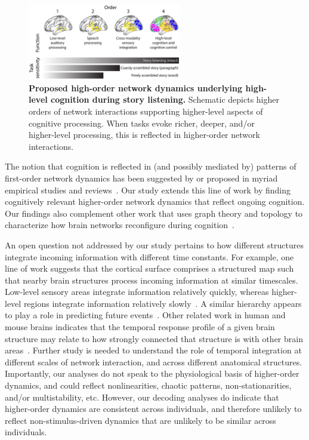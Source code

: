\documentclass[english]{article}
\begin{document}
\begin{figure}[tp]
  \centering
  \includegraphics[width=0.6\textwidth]{figs/discussion}
  \caption{\textbf{Proposed high-order network dynamics underlying
       high-level cognition during story listening.}  Schematic depicts
    higher orders of
    network interactions supporting higher-level aspects of cognitive
    processing.  When tasks evoke richer, deeper, and/or higher-level
    processing, this is reflected in higher-order network
    interactions.}
  \label{fig:discussion}
\end{figure}

The notion that cognition is reflected in (and possibly mediated by)
patterns of first-order network dynamics has been suggested by or
proposed in myriad empirical studies and
reviews~\cite{DemeEtal19, Turk13, LuriEtal18, FongEtal19,
  ParkEtal18b, PretEtal17, MannEtal18, RoyEtal19, LiegEtal19, ZouEtal19,
  ChanGlov10, GonzEtal19, McIn00, BresKels01}.  Our study extends this line of work by
finding cognitively relevant higher-order network dynamics
that reflect ongoing cognition.  Our findings also complement other work
that uses graph theory and topology to characterize how brain networks
reconfigure during cognition~\cite{BassEtal06, ZhenEtal19,
  McInJirs19, TokeSomm19, SizeEtal18, ReimEtal17, BetzEtal19}.

An open question not addressed by our study pertains to how different
structures integrate incoming information with different time
constants.  For example, one line of work suggests that the cortical
surface comprises a structured map such that nearby brain structures
process incoming information at similar timescales.  Low-level sensory
areas integrate information relatively quickly, whereas higher-level
regions integrate information relatively slowly~\cite{BaldEtal17,
  HassEtal08, HassEtal15, HoneEtal12a, LernEtal11, LernEtal14,
  ChieHone19}.  A similar hierarchy appears to play a role in
predicting future events~\cite{LeeEtal20}.  Other related work in
human and mouse brains indicates that the temporal response profile of
a given brain structure may relate to how strongly connected that
structure is with other brain areas~\cite{FallEtal20}.  Further study
is needed to understand the role of temporal integration at different
scales of network interaction, and across different anatomical
structures. Importantly, our analyses do not speak to the
physiological basis of higher-order dynamics, and could reflect
nonlinearities, chaotic patterns, non-stationarities, and/or
multistability, etc. However, our decoding analyses do indicate that
higher-order dynamics are consistent across individuals, and therefore
unlikely to reflect non-stimulus-driven dynamics that are unlikely to
be similar across individuals.
\end{document}
